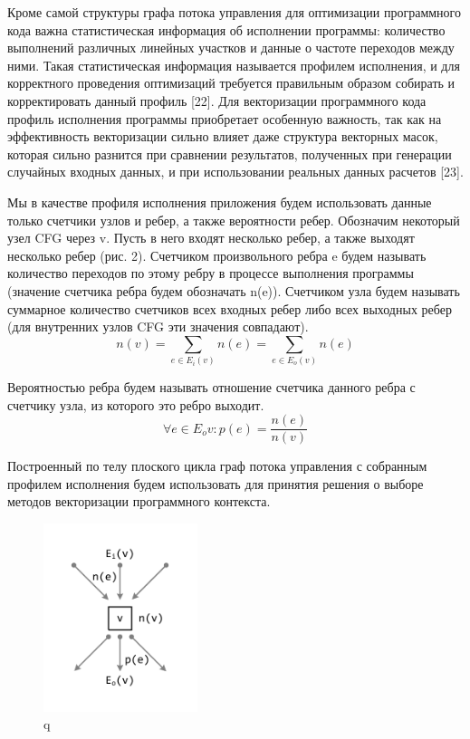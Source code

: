 Кроме самой структуры графа потока управления для оптимизации программного кода важна статистическая информация об исполнении программы: количество выполнений различных линейных участков и данные о частоте переходов между ними.
Такая статистическая информация называется профилем исполнения, и для корректного проведения оптимизаций требуется правильным образом собирать и корректировать данный профиль [22].
Для векторизации программного кода профиль исполнения программы приобретает особенную важность, так как на эффективность векторизации сильно влияет даже структура векторных масок, которая сильно разнится при сравнении результатов, полученных при генерации случайных входных данных, и при использовании реальных данных расчетов [23].

Мы в качестве профиля исполнения приложения будем использовать данные только счетчики узлов и ребер, а также вероятности ребер. Обозначим некоторый узел CFG через v. Пусть в него входят несколько ребер, а также выходят несколько ребер (рис. 2).
Счетчиком произвольного ребра e будем называть количество переходов по этому ребру в процессе выполнения программы (значение счетчика ребра будем обозначать n(e)).
Счетчиком узла будем называть суммарное количество счетчиков всех входных ребер либо всех выходных ребер (для внутренних узлов CFG эти значения совпадают).
\begin{equation}
	n(v) = \sum_{e \in E_i(v)}{n(e)} = \sum_{e \in E_o(v)}{n(e)}
\end{equation}

Вероятностью ребра будем называть отношение счетчика данного ребра с счетчику узла, из которого это ребро выходит.
\begin{equation}
	\forall e \in E_o{v}: p(e) = \frac{n(e)}{n(v)}
\end{equation}

Построенный по телу плоского цикла граф потока управления с собранным профилем исполнения будем использовать для принятия решения о выборе методов векторизации программного контекста.

\begin{figure}[ht]
\centering
\includegraphics[width=0.4\textwidth]{./pics/text_4_flat/cfg.pdf}
\caption{q}
\label{lab}
\end{figure}
